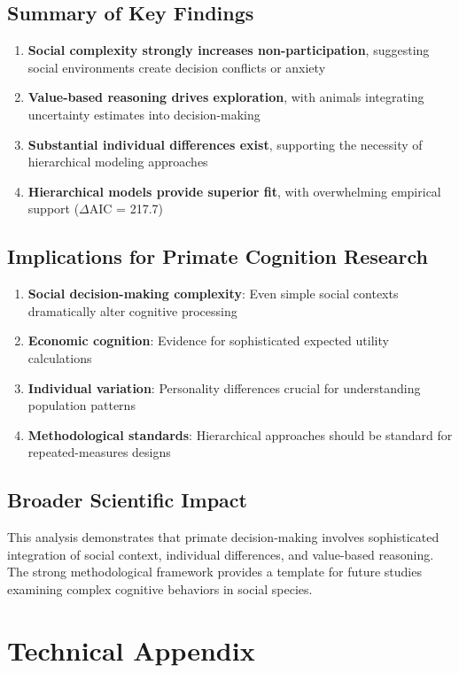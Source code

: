 \documentclass[11pt]{article}
\begin{document}
\subsection{Summary of Key Findings}
\begin{enumerate}
    \item \textbf{Social complexity strongly increases non-participation}, suggesting social environments create decision conflicts or anxiety
    \item \textbf{Value-based reasoning drives exploration}, with animals integrating uncertainty estimates into decision-making
    \item \textbf{Substantial individual differences exist}, supporting the necessity of hierarchical modeling approaches
    \item \textbf{Hierarchical models provide superior fit}, with overwhelming empirical support ($\Delta$AIC = 217.7)
\end{enumerate}

\subsection{Implications for Primate Cognition Research}
\begin{enumerate}
    \item \textbf{Social decision-making complexity}: Even simple social contexts dramatically alter cognitive processing
    \item \textbf{Economic cognition}: Evidence for sophisticated expected utility calculations
    \item \textbf{Individual variation}: Personality differences crucial for understanding population patterns
    \item \textbf{Methodological standards}: Hierarchical approaches should be standard for repeated-measures designs
\end{enumerate}

\subsection{Broader Scientific Impact}
This analysis demonstrates that primate decision-making involves sophisticated integration of social context, individual differences, and value-based reasoning. The strong methodological framework provides a template for future studies examining complex cognitive behaviors in social species.

\section{Technical Appendix}
\end{document}
